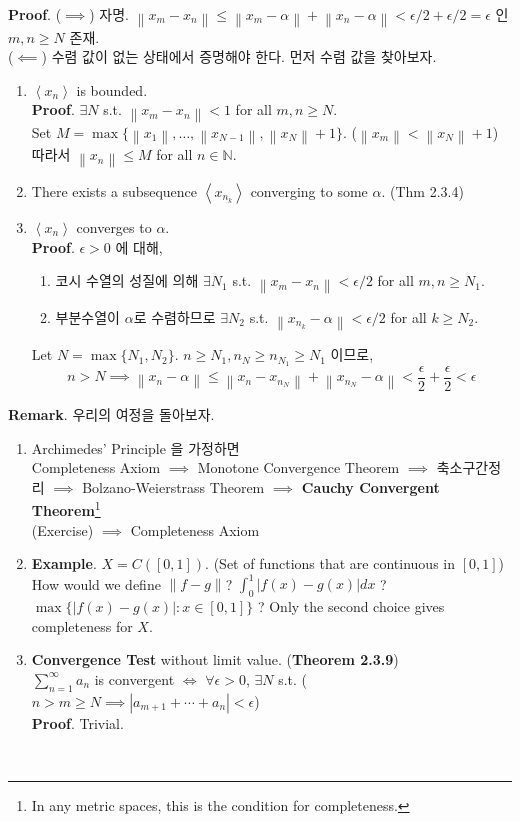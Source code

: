 \documentclass[12pt]{report}
\newcommand{\bb}[1]{\mathbb{#1}}
\newcommand{\norm}[1]{\left\lVert#1\right\rVert}
\renewcommand{\span}[1]{\left\langle #1 \right\rangle}
\newcommand{\abs}[1]{\left|#1\right|}
\newcommand{\imp}{\implies}
\begin{document}
\textbf{Proof}. ($\imp$) 자명. $\norm{x_m-x_n} \leq \norm{x_m-\alpha} + \norm{x_n-\alpha} < \epsilon/2+\epsilon/2 = \epsilon$ 인 $m, n\geq N$ 존재.\\
($\impliedby$) 수렴 값이 없는 상태에서 증명해야 한다. 먼저 수렴 값을 찾아보자.
\begin{enumerate}
	\item $\span{x_n}$ is bounded.\\
	\textbf{Proof}. $\exists N$ s.t. $\norm{x_m-x_n} < 1$ for all $m, n\geq N$.\\
	Set $M = \max\{\norm{x_1}, \dots, \norm{x_{N-1}}, \norm{x_N}+1 \}$. ($\norm{x_m} < \norm{x_N}+1$)\\
	따라서 $\norm{x_n}\leq M$ for all $n\in\bb{N}$.
	\item There exists a subsequence $\span{x_{n_k}}$ converging to some $\alpha$. (Thm 2.3.4)
	\item $\span{x_n}$ converges to $\alpha$.\\
	\textbf{Proof}. $\epsilon>0$ 에 대해, 
	\begin{enumerate}
		\item 코시 수열의 성질에 의해 $\exists N_1$ s.t. $\norm{x_m-x_n}<\epsilon/2$ for all $m, n\geq N_1$.
		\item 부분수열이 $\alpha$로 수렴하므로 $\exists N_2$ s.t. $\norm{x_{n_k} -\alpha} < \epsilon/2$ for all $k\geq N_2$. 
	\end{enumerate}
	Let $N = \max\{N_1, N_2 \}$. $ n\geq N_1, n_N\geq n_{N_1} \geq N_1 $ 이므로,\\
	$$n>N \imp \norm{x_n - \alpha}\leq \norm{x_n-x_{n_N}} + \norm{x_{n_N} - \alpha} < \frac{\epsilon}{2} + \frac{\epsilon}{2} < \epsilon$$
\end{enumerate}
\pagebreak
\textbf{Remark}. 우리의 여정을 돌아보자. 
\begin{enumerate}
	\item Archimedes' Principle 을 가정하면\\
	Completeness Axiom $\imp$ Monotone Convergence Theorem $\imp$ 축소구간정리 $\imp$ Bolzano-Weierstrass Theorem $\imp$ \textbf{Cauchy Convergent Theorem}\footnote{In any metric spaces, this is the condition for completeness.} \\
	(Exercise) $\imp$ Completeness Axiom
	\item \textbf{Example}. $X = C([0, 1])$. (Set of functions that are continuous in $[0, 1]$) How would we define $\norm{f-g}$? $\int_0^1 \abs{f(x)-g(x)}dx$ ? $\max\{\abs{f(x)-g(x)}: x\in[0, 1]\}$ ? Only the second choice gives completeness for $X$.
	\item \textbf{Convergence Test} without limit value. (\textbf{Theorem 2.3.9}) \\
	$\sum_{n=1}^{\infty} a_n$ is convergent $\iff$ $\forall\epsilon > 0$, $\exists N$ s.t. ($n > m \geq N \imp \abs{a_{m+1} + \cdots + a_n} < \epsilon$)\\
	\textbf{Proof}. Trivial.
\end{enumerate}~\\
\end{document}
